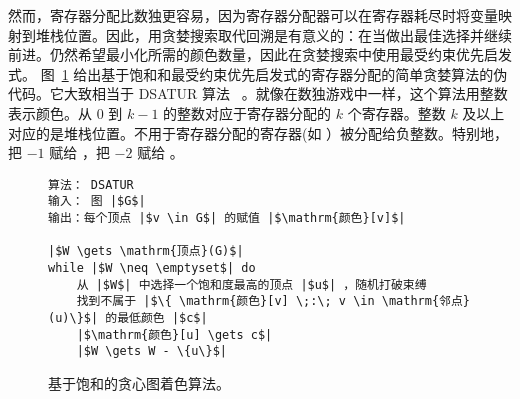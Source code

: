 \documentclass[11pt]{book}
\begin{document}
然而，寄存器分配比数独更容易，因为寄存器分配器可以在寄存器耗尽时将变量映射到堆栈位置。因此，用贪婪搜索取代回溯是有意义的：在当做出最佳选择并继续前进。仍然希望最小化所需的颜色数量，因此在贪婪搜索中使用最受约束优先启发式。
图~\ref{fig:satur-algo} 给出基于饱和和最受约束优先启发式的寄存器分配的简单贪婪算法的伪代码。它大致相当于 DSATUR
算法~\citep{Brelaz:1979eu,Gebremedhin:1999fk,Omari:2006uq} 。就像在数独游戏中一样，这个算法用整数表示颜色。从 $0$ 到 $k-1$ 的整数对应于寄存器分配的 $k$ 个寄存器。整数 $k$ 及以上对应的是堆栈位置。不用于寄存器分配的寄存器(如  ）被分配给负整数。特别地，把 $-1$ 赋给  ，把 $-2$ 赋给  。



\begin{figure}[btp]
  \centering
\begin{lstlisting}[basicstyle=\rmfamily,deletekeywords={for,from,with,is,not,in,find},morekeywords={while},columns=fullflexible]
算法： DSATUR
输入： 图 |$G$|
输出：每个顶点 |$v \in G$| 的赋值 |$\mathrm{颜色}[v]$| 

|$W \gets \mathrm{顶点}(G)$|
while |$W \neq \emptyset$| do
    从 |$W$| 中选择一个饱和度最高的顶点 |$u$| ，随机打破束缚
    找到不属于 |$\{ \mathrm{颜色}[v] \;:\; v \in \mathrm{邻点}(u)\}$| 的最低颜色 |$c$| 
    |$\mathrm{颜色}[u] \gets c$|
    |$W \gets W - \{u\}$|
\end{lstlisting}
  \caption{基于饱和的贪心图着色算法。}
  \label{fig:satur-algo}
\end{figure}
\end{document}
